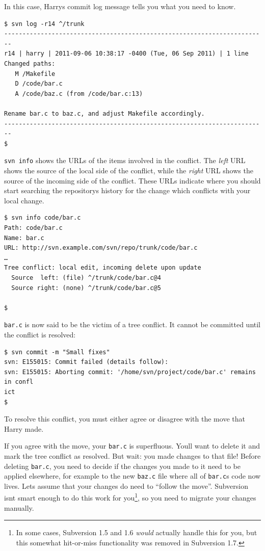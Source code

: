 In this case, Harry\textquotesingle s commit log message tells you what
you need to know.

\begin{verbatim}
$ svn log -r14 ^/trunk
------------------------------------------------------------------------
r14 | harry | 2011-09-06 10:38:17 -0400 (Tue, 06 Sep 2011) | 1 line
Changed paths:
   M /Makefile
   D /code/bar.c
   A /code/baz.c (from /code/bar.c:13)

Rename bar.c to baz.c, and adjust Makefile accordingly.
------------------------------------------------------------------------
$
\end{verbatim}

\texttt{svn\ info} shows the URLs of the items involved in the conflict.
The \emph{left} URL shows the source of the local side of the conflict,
while the \emph{right} URL shows the source of the incoming side of the
conflict. These URLs indicate where you should start searching the
repository\textquotesingle s history for the change which conflicts with
your local change.

\begin{verbatim}
$ svn info code/bar.c
Path: code/bar.c
Name: bar.c
URL: http://svn.example.com/svn/repo/trunk/code/bar.c
…
Tree conflict: local edit, incoming delete upon update
  Source  left: (file) ^/trunk/code/bar.c@4
  Source right: (none) ^/trunk/code/bar.c@5

$
\end{verbatim}

\texttt{bar.c} is now said to be the victim of a tree conflict. It
cannot be committed until the conflict is resolved:

\begin{verbatim}
$ svn commit -m "Small fixes" 
svn: E155015: Commit failed (details follow):
svn: E155015: Aborting commit: '/home/svn/project/code/bar.c' remains in confl
ict
$
\end{verbatim}

To resolve this conflict, you must either agree or disagree with the
move that Harry made.

If you agree with the move, your \texttt{bar.c} is superfluous.
You\textquotesingle ll want to delete it and mark the tree conflict as
resolved. But wait: you made changes to that file! Before deleting
\texttt{bar.c}, you need to decide if the changes you made to it need to
be applied elsewhere, for example to the new \texttt{baz.c} file where
all of \texttt{bar.c}\textquotesingle s code now lives.
Let\textquotesingle s assume that your changes do need to ``follow the
move''. Subversion isn\textquotesingle t smart enough to do this work
for you\footnote{In some cases, Subversion 1.5 and 1.6 \emph{would}
  actually handle this for you, but this somewhat hit-or-miss
  functionality was removed in Subversion 1.7.}, so you need to migrate
your changes manually.

